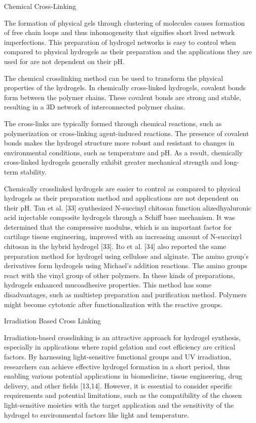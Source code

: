 \documentclass[../../main-notes.tex]{subfiles}
\begin{document}
Chemical Cross-Linking

The formation of physical gels through clustering of molecules causes formation of free chain loops and thus inhomogeneity that signifies short lived network imperfections. 
This preparation of hydrogel networks is easy to control when compared to physical hydrogels as their preparation and the applications they are used for are not dependent on their pH. 

The chemical crosslinking method can be used to transform the physical properties of the hydrogels. 
In chemically cross-linked hydrogels, covalent bonds form between the polymer chains.
These covalent bonds are strong and stable, resulting in a 3D network of interconnected polymer chains. 

The cross-links are typically formed through chemical reactions, such as polymerization or cross-linking agent-induced reactions. 
The presence of covalent bonds makes the hydrogel structure more robust and resistant to changes in environmental conditions, such as temperature and pH. 
As a result, chemically cross-linked hydrogels generally exhibit greater mechanical strength and long-term stability. 

Chemically crosslinked hydrogels are easier to control as compared to physical hydrogels as their preparation method and applications are not dependent on their pH. 
Tan et al. [33] synthesized N-succinyl chitosan function alizedhyaluronic acid injectable composite hydrogels through a Schiff base mechanism. 
It was determined that the compressive modulus, which is an important factor for cartilage tissue engineering, improved with an increasing amount of N-succinyl chitosan in the hybrid hydrogel [33]. 
Ito et al. [34] also reported the same preparation method for hydrogel using cellulose and alginate. The amino group’s derivatives form hydrogels using Michael’s addition reactions. 
The amino groups react with the vinyl group of other polymers. 
In these kinds of preparations, hydrogels enhanced mucoadhesive properties. This method has some disadvantages, such as multistep preparation and purification method. Polymers might become cytotoxic after functionalization with the reactive groups.


Irradiation Based Cross Linking

Irradiation-based crosslinking is an attractive approach for hydrogel synthesis, especially in applications where rapid gelation and cost efficiency are critical factors. 
By harnessing light-sensitive functional groups and UV irradiation, researchers can achieve effective hydrogel formation in a short period, thus enabling various potential applications in biomedicine, tissue engineering, drug delivery, and other fields [13,14]. 
However, it is essential to consider specific requirements and potential limitations, such as the compatibility of the chosen light-sensitive moieties with the target application and the sensitivity of the hydrogel to environmental factors like light and temperature. 
\end{document}
